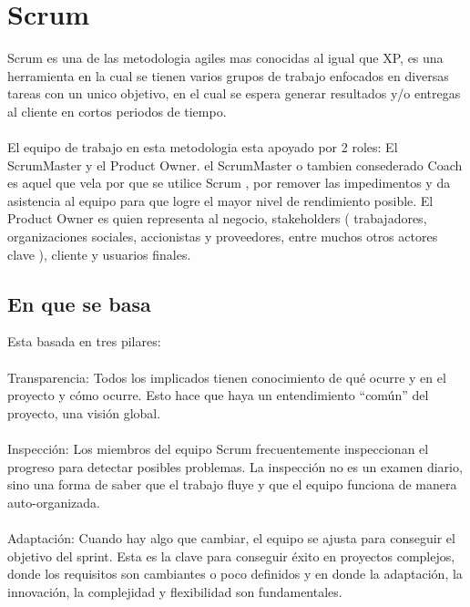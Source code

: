 \section{Scrum}
Scrum es una de las metodologia agiles mas conocidas al igual que XP, es una herramienta en la cual se tienen varios grupos de trabajo enfocados en diversas tareas con un unico objetivo, en el cual se espera generar resultados y/o entregas al cliente en cortos periodos de tiempo.
\\
\\
El equipo de trabajo en esta metodologia esta apoyado por 2 roles:  El ScrumMaster y el Product Owner. el ScrumMaster o tambien consederado Coach es aquel que vela por que se utilice Scrum , por remover las impedimentos y da asistencia al equipo para que logre el mayor nivel de rendimiento  posible.  El   Product   Owner   es 
quien     representa      al  negocio,  stakeholders ( trabajadores, organizaciones sociales, accionistas y proveedores, entre muchos otros actores clave ),         cliente    y  usuarios 
finales. 
\subsection{En que se basa}

Esta basada en tres pilares:
\\
\\
Transparencia: Todos los implicados tienen conocimiento de qué ocurre y en el proyecto y cómo ocurre. Esto hace que haya un entendimiento “común” del proyecto, una visión global.
\\
\\
Inspección: Los miembros del equipo Scrum frecuentemente inspeccionan el progreso para detectar posibles problemas. La inspección no es un examen diario, sino una forma de saber que el trabajo fluye y que el equipo funciona de manera auto-organizada.
\\
\\
Adaptación: Cuando hay algo que cambiar, el equipo se ajusta para conseguir el objetivo del sprint. Esta es la clave para conseguir éxito en proyectos complejos, donde los requisitos son cambiantes o poco definidos y en donde la adaptación, la innovación, la complejidad y flexibilidad son fundamentales.


